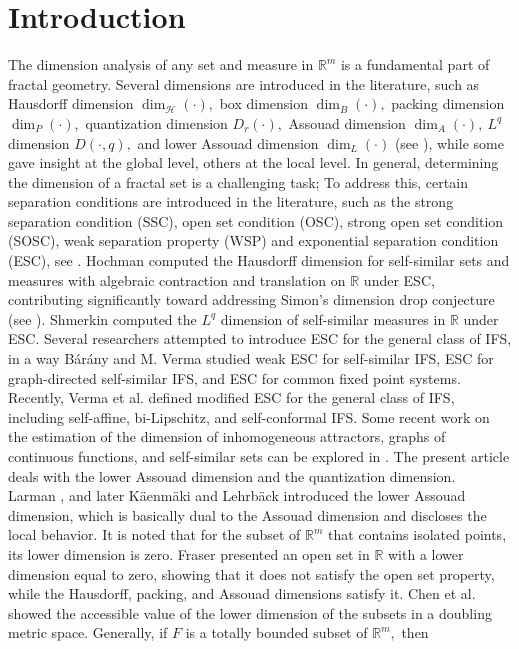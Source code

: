 \documentclass{amsproc}
\theoremstyle{definition}
\theoremstyle{remark}
\numberwithin{equation}{section}
\begin{document}
\maketitle

\section{Introduction}
The dimension analysis of any set and measure in $\mathbb{R}^m$ is a fundamental part of fractal geometry. Several dimensions are introduced in the literature, such as Hausdorff dimension $\dim_\mathcal{H}(\cdot),$ box dimension $\dim_B(\cdot),$ packing dimension $\dim_P(\cdot),$ quantization dimension $D_r(\cdot),$ Assouad dimension $\dim_A(\cdot),~L^q$ dimension $D(\cdot,q),$ and lower Assouad dimension $\dim_L(\cdot)$ (see \cite{Fal, Fraser, KNZ1, Mat3, Sh1, Zador}), while some gave insight at the global level, others at the local level. In general, determining the dimension of a fractal set is a challenging task; To address this, certain separation conditions are introduced in the literature, such as the strong separation condition (SSC), open set condition (OSC), strong open set condition (SOSC), weak separation property (WSP) and exponential separation condition (ESC), see \cite{Fraser, Schief, VP1}. Hochman \cite{MHOCHMAN} computed the Hausdorff dimension for self-similar sets and measures with algebraic contraction and translation on $\mathbb{R}$ under ESC, contributing significantly toward addressing Simon's dimension drop conjecture (see \cite{Simon}). Shmerkin \cite[Theorem 6.6]{Sh1} computed the $L^q$ dimension of self-similar measures in $\mathbb{R}$ under ESC. Several researchers attempted to introduce ESC for the general class of IFS, in a way B\'ar\'any and M. Verma \cite{BV1} studied weak ESC for self-similar IFS, ESC for graph-directed self-similar IFS, and ESC for common fixed point systems. Recently, Verma et al. \cite{VAM} defined modified ESC for the general class of IFS, including self-affine, bi-Lipschitz, and self-conformal IFS. Some recent work on the estimation of the dimension of inhomogeneous attractors, graphs of continuous functions, and self-similar sets can be explored in \cite{B, Bayart, Bed, SS3, DV1, DV2, DV3, PPV1, MV1}. The present article deals with the lower Assouad dimension and the quantization dimension.\\
Larman \cite{Larman}, and later K\"aenm\"aki and Lehrb\"ack \cite{AL} introduced the lower Assouad dimension, which is basically dual to the Assouad dimension and discloses the local behavior. It is noted that for the subset of $\mathbb{R}^m$ that contains isolated points, its lower dimension is zero. Fraser \cite[Example 2.5]{Fraser12} presented an open set in $\mathbb{R}$ with a lower dimension equal to zero, showing that it does not satisfy the open set property, while the Hausdorff, packing, and Assouad dimensions satisfy it. Chen et al. \cite[Theorem 1]{Chen} showed the accessible value of the lower dimension of the subsets in a doubling metric space. Generally, if $F$ is a totally bounded subset of $\mathbb{R}^m,$ then
\end{document}
